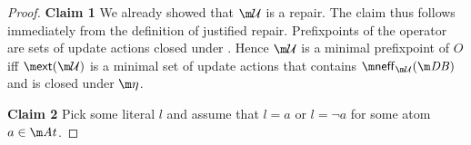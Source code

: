 \begin{proof}
% 

\textbf{Claim 1}
We already showed that $\UU$ is a repair. The claim thus
follows immediately from the definition of justified repair. Prefixpoints of the \closure operator are sets of update actions closed under \aics. Hence $\UU$ is a minimal prefixpoint of $O$ iff $\ext(\UU)$ is a minimal set of update actions that contains $\neff_{\UU}(\db)$ and is closed under $\aics$. 


\textbf{Claim 2} Pick some literal $l$ and assume that $l=a$ or $l=\lnot a$ for some atom $a\in \atoms$.


\end{proof}
